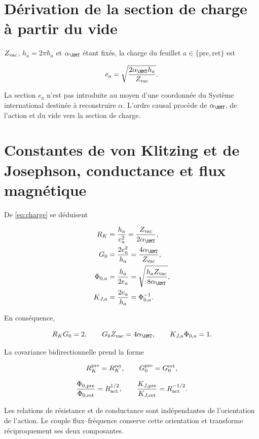 \label{ch:metrology}

\section{Dérivation de la section de charge à partir du vide}

\(Z_{\rm vac}\), \(h_a=2\pi\hbar_a\) et \(\alpha_{\HMT}\) étant fixés, la charge du feuillet \(a\in\{\mathrm{pre},\mathrm{ret}\}\) est

\begin{equation}
e_a=\sqrt{\frac{2\alpha_{\HMT}h_a}{Z_{\rm vac}}}.
\label{eq:charge}
\end{equation}

La section \(e_a\) n'est pas introduite au moyen d'une coordonnée du Système
international destinée à reconstruire \(\alpha\). L'ordre causal procède de
\(\alpha_{\HMT}\), de l'action et du vide vers la section de charge.

\section{Constantes de von Klitzing et de Josephson, conductance et flux magnétique}

De \cref{eq:charge} se déduisent

\begin{align}
R_K&=\frac{h_a}{e_a^2}=\frac{Z_{\rm vac}}{2\alpha_{\HMT}},
\label{eq:rk}\\
G_0&=\frac{2e_a^2}{h_a}=\frac{4\alpha_{\HMT}}{Z_{\rm vac}},
\label{eq:g0}\\
\Phi_{0,a}&=\frac{h_a}{2e_a}
=\sqrt{\frac{h_aZ_{\rm vac}}{8\alpha_{\HMT}}},
\label{eq:phi0}\\
K_{J,a}&=\frac{2e_a}{h_a}=\Phi_{0,a}^{-1}.
\label{eq:kj}
\end{align}

En conséquence,

\begin{equation}
R_KG_0=2,\qquad G_0Z_{\rm vac}=4\alpha_{\HMT},
\qquad K_{J,a}\Phi_{0,a}=1.
\label{eq:quantum-electrical-identities}
\end{equation}

La covariance bidirectionnelle prend la forme

\[
R_K^{\rm pre}=R_K^{\rm ret},\qquad
G_0^{\rm pre}=G_0^{\rm ret},
\]

\[
\frac{\Phi_{0,\rm pre}}{\Phi_{0,\rm ret}}=R_{\rm act}^{1/2},
\qquad
\frac{K_{J,\rm pre}}{K_{J,\rm ret}}=R_{\rm act}^{-1/2}.
\]

Les relations de résistance et de conductance sont indépendantes de
l'orientation de l'action. Le couple flux--fréquence conserve cette
orientation et transforme réciproquement ses deux composantes.

